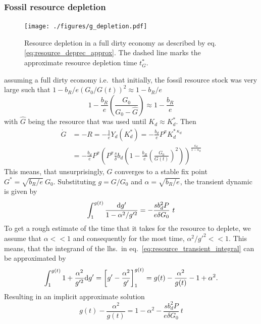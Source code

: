 \subsubsection{Fossil resource depletion}
\begin{figure}
	\texttt{[image: ./figures/g\_depletion.pdf]}
	\caption{Resource depletion in a full dirty economy as described by eq. \eqref{eq:resource_deprec_approx}. The dashed line marks the approximate resource depletion time $t^*_G$. \label{fig:g_depletion}}
\end{figure}
assuming a full dirty economy i.e.\ that initially, the fossil resource stock was very large such that $1-b_R/e (G_0/G(t))^{2} \approx 1-b_R/e$
\begin{equation}
	1-\frac{b_R}{e}\left( \frac{G_0}{G_0 - \hat{G}} \right) \approx 1-\frac{b_R}{e}
	\label{eq:resource_cost_approx}
\end{equation}
with $\hat{G}$ being the resource that was used until $K_d \approx K^{*}_d$. Then
\begin{align}
	\dot{G} &= -R = -\frac{1}{e}Y_d(K^*_d) = -\frac{b_d}{e}P^{\pi}K_d^{*\ \kappa_d} \\
	&= - \frac{b_d}{e}P^{\pi}\left(P^{\pi} \frac{s}{\delta}b_d\left( 1-\frac{b_R}{e}\left( \frac{G_0}{G(t)} \right)^2 \right) \right)^{\frac{\kappa_d}{1-\kappa_d}}
	\label{eq:resource_deprec_approx}
\end{align}
This means, that unsurprisingly, $G$ converges to a stable fix point $G^* = \sqrt{b_R/e}\ G_0$. Substituting $g = G/G_0$ and $\alpha = \sqrt{b_R/e}$, the transient dynamic is given by
\begin{equation}
	\int_1^{g(t)} \frac{{\rm d} g'}{1 - \alpha^2/g'^2} = - \frac{s b_d^2 P}{e \delta G_0} \ t
	\label{eq:resource_transient_integral}
\end{equation}
To get a rough estimate of the time that it takes for the resource to deplete, we assume that $\alpha << 1$ and consequently for the most time, $\alpha^2/g'^2 << 1$.
This means, that the integrand of the lhs.\ in eq.~\eqref{eq:resource_transient_integral} can be approximated by
\begin{equation}
	\int_1^{g(t)}1+\frac{\alpha^2}{g'^2} {\rm d}g' = \left[ g' - \frac{\alpha^2}{g'} \right]_1^{g(t)} = g(t) - \frac{\alpha^2}{g(t)} -1+\alpha^2.
	\label{eq:resource_transient_solution}
\end{equation}
Resulting in an implicit approximate solution
\begin{equation}
	g(t) - \frac{\alpha^2}{g(t)} = 1 -\alpha^2 - \frac{s b_d^2 P}{e \delta G_0} \ t
	\label{eq:resource_transient_solution2}
\end{equation}
